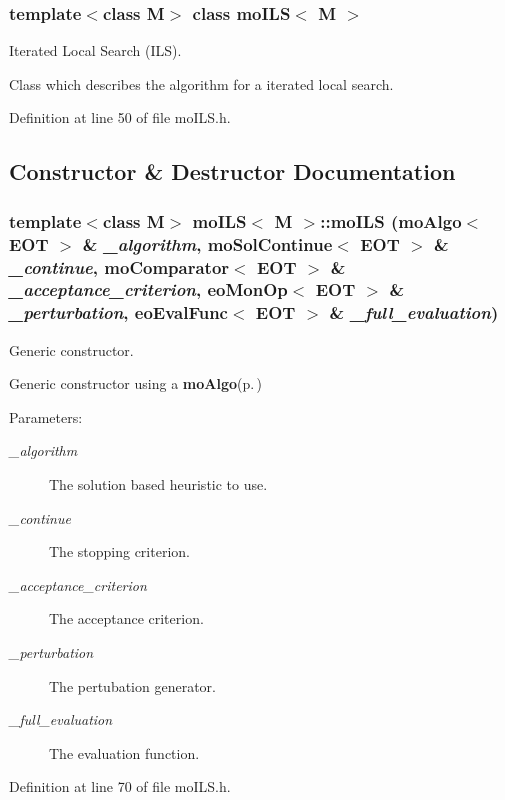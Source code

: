 \subsubsection*{template$<$class M$>$ class mo\-ILS$<$ M $>$}

Iterated Local Search (ILS). 

Class which describes the algorithm for a iterated local search. 



Definition at line 50 of file mo\-ILS.h.

\subsection{Constructor \& Destructor Documentation}
\subsubsection{\setlength{\rightskip}{0pt plus 5cm}template$<$class M$>$ {\bf mo\-ILS}$<$ M $>$::{\bf mo\-ILS} ({\bf mo\-Algo}$<$ {\bf EOT} $>$ \& {\em \_\-algorithm}, {\bf mo\-Sol\-Continue}$<$ {\bf EOT} $>$ \& {\em \_\-continue}, {\bf mo\-Comparator}$<$ {\bf EOT} $>$ \& {\em \_\-acceptance\_\-criterion}, {\bf eo\-Mon\-Op}$<$ {\bf EOT} $>$ \& {\em \_\-perturbation}, {\bf eo\-Eval\-Func}$<$ {\bf EOT} $>$ \& {\em \_\-full\_\-evaluation})\hspace{0.3cm}{\tt  [inline]}}\label{classmo_i_l_s_a0}


Generic constructor. 

Generic constructor using a {\bf mo\-Algo}{\rm (p.\,\pageref{classmo_algo})}

\begin{Desc}
\item[Parameters:]
\begin{description}
\item[{\em \_\-algorithm}]The solution based heuristic to use. \item[{\em \_\-continue}]The stopping criterion. \item[{\em \_\-acceptance\_\-criterion}]The acceptance criterion. \item[{\em \_\-perturbation}]The pertubation generator. \item[{\em \_\-full\_\-evaluation}]The evaluation function. \end{description}
\end{Desc}


Definition at line 70 of file mo\-ILS.h.

